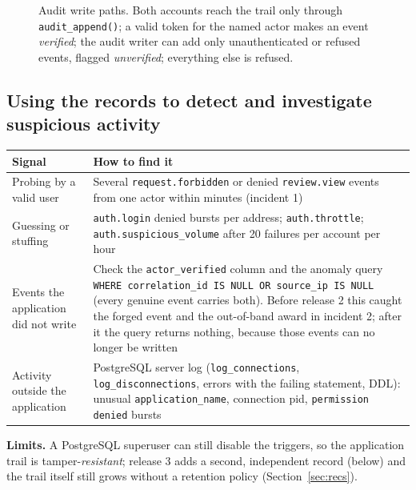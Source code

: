 \documentclass[10pt,a4paper]{article}
\newcommand{\code}[1]{\nolinkurl{#1}}
\newcommand{\diagram}[3]{\begin{figure}[!htbp]\centering\adjustbox{max width=\linewidth,max height=6.6cm}{}\caption{#2}\label{fig:#3}\end{figure}}
\begin{document}
\diagram{auditpaths}{Audit write paths. Both accounts reach the trail only through \code{audit\_append()}; a valid token for the named actor makes an event \emph{verified}; the audit writer can add only unauthenticated or refused events, flagged \emph{unverified}; everything else is refused.}{auditpaths}

\subsection{Using the records to detect and investigate suspicious activity}
\begin{center}\small
\begin{tabularx}{\linewidth}{@{}L{4.2cm}Y@{}}
\toprule\textbf{Signal} & \textbf{How to find it}\\\midrule
Probing by a valid user & Several \code{request.forbidden} or denied \code{review.view} events from one actor within minutes (incident 1)\\
Guessing or stuffing & \code{auth.login} denied bursts per address; \code{auth.throttle}; \code{auth.suspicious_volume} after 20 failures per account per hour\\
Events the application did not write & Check the \code{actor\_verified} column and the anomaly query \code{WHERE correlation\_id IS NULL OR source\_ip IS NULL} (every genuine event carries both). Before release 2 this caught the forged event and the out-of-band award in incident 2; after it the query returns nothing, because those events can no longer be written\\
Activity outside the application & PostgreSQL server log (\code{log_connections}, \code{log_disconnections}, errors with the failing statement, DDL): unusual \code{application_name}, connection pid, \code{permission denied} bursts\\
\bottomrule\end{tabularx}\end{center}
\textbf{Limits.} A PostgreSQL superuser can still disable the triggers, so the application trail is tamper-\emph{resistant}; release 3 adds a second, independent record (below) and the trail itself still grows without a retention policy (Section~\ref{sec:recs}).
\end{document}
